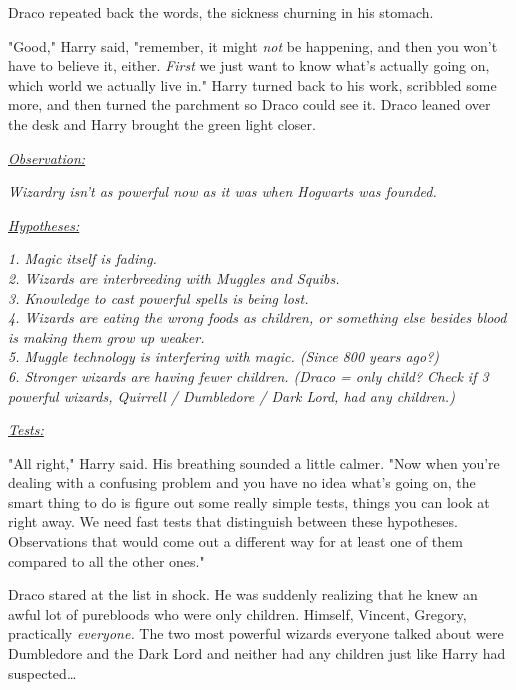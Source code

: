 Draco repeated back the words, the sickness churning in his stomach.

"Good," Harry said, "remember, it might \emph{not} be happening, and then you 
won't have to believe it, either. \emph{First} we just want to know what's 
actually going on, which world we actually live in." Harry turned back to his 
work, scribbled some more, and then turned the parchment so Draco could see it. 
Draco leaned over the desk and Harry brought the green light closer.

\emph{\underline{Observation:}}

\emph{Wizardry isn't as powerful now as it was when Hogwarts was founded.}

\emph{\underline{Hypotheses:}}

\emph{1. Magic itself is fading.\\
2. Wizards are interbreeding with Muggles and Squibs.\\
3. Knowledge to cast powerful spells is being lost.\\
4. Wizards are eating the wrong foods as children, or something else besides 
blood is making them grow up weaker.\\
5. Muggle technology is interfering with magic. (Since 800 years ago?)\\
6. Stronger wizards are having fewer children. (Draco = only child? Check if 3 
powerful wizards, Quirrell / Dumbledore / Dark Lord, had any children.)}

\emph{\underline{Tests:}}

"All right," Harry said. His breathing sounded a little calmer. "Now when 
you're dealing with a confusing problem and you have no idea what's going on, 
the smart thing to do is figure out some really simple tests, things you can 
look at right away. We need fast tests that distinguish between these 
hypotheses. Observations that would come out a different way for at least one 
of them compared to all the other ones."

Draco stared at the list in shock. He was suddenly realizing that he knew an 
awful lot of purebloods who were only children. Himself, Vincent, Gregory, 
practically \emph{everyone.} The two most powerful wizards everyone talked 
about were Dumbledore and the Dark Lord and neither had any children just like 
Harry had suspected{\ldots}

